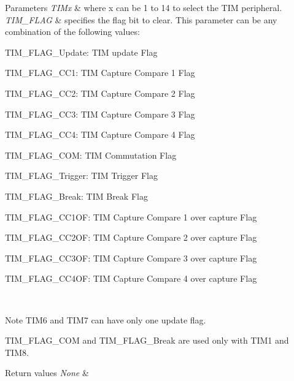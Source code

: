\begin{DoxyParams}{Parameters}
{\em T\+I\+Mx} & where x can be 1 to 14 to select the T\+IM peripheral. \\
\hline
{\em T\+I\+M\+\_\+\+F\+L\+AG} & specifies the flag bit to clear. This parameter can be any combination of the following values\+: \begin{DoxyItemize}
\item T\+I\+M\+\_\+\+F\+L\+A\+G\+\_\+\+Update\+: T\+IM update Flag \item T\+I\+M\+\_\+\+F\+L\+A\+G\+\_\+\+C\+C1\+: T\+IM Capture Compare 1 Flag \item T\+I\+M\+\_\+\+F\+L\+A\+G\+\_\+\+C\+C2\+: T\+IM Capture Compare 2 Flag \item T\+I\+M\+\_\+\+F\+L\+A\+G\+\_\+\+C\+C3\+: T\+IM Capture Compare 3 Flag \item T\+I\+M\+\_\+\+F\+L\+A\+G\+\_\+\+C\+C4\+: T\+IM Capture Compare 4 Flag \item T\+I\+M\+\_\+\+F\+L\+A\+G\+\_\+\+C\+OM\+: T\+IM Commutation Flag \item T\+I\+M\+\_\+\+F\+L\+A\+G\+\_\+\+Trigger\+: T\+IM Trigger Flag \item T\+I\+M\+\_\+\+F\+L\+A\+G\+\_\+\+Break\+: T\+IM Break Flag \item T\+I\+M\+\_\+\+F\+L\+A\+G\+\_\+\+C\+C1\+OF\+: T\+IM Capture Compare 1 over capture Flag \item T\+I\+M\+\_\+\+F\+L\+A\+G\+\_\+\+C\+C2\+OF\+: T\+IM Capture Compare 2 over capture Flag \item T\+I\+M\+\_\+\+F\+L\+A\+G\+\_\+\+C\+C3\+OF\+: T\+IM Capture Compare 3 over capture Flag \item T\+I\+M\+\_\+\+F\+L\+A\+G\+\_\+\+C\+C4\+OF\+: T\+IM Capture Compare 4 over capture Flag\end{DoxyItemize}
\\
\hline
\end{DoxyParams}
\begin{DoxyNote}{Note}
T\+I\+M6 and T\+I\+M7 can have only one update flag. 

T\+I\+M\+\_\+\+F\+L\+A\+G\+\_\+\+C\+OM and T\+I\+M\+\_\+\+F\+L\+A\+G\+\_\+\+Break are used only with T\+I\+M1 and T\+I\+M8.
\end{DoxyNote}

\begin{DoxyRetVals}{Return values}
{\em None} & \\
\hline
\end{DoxyRetVals}
